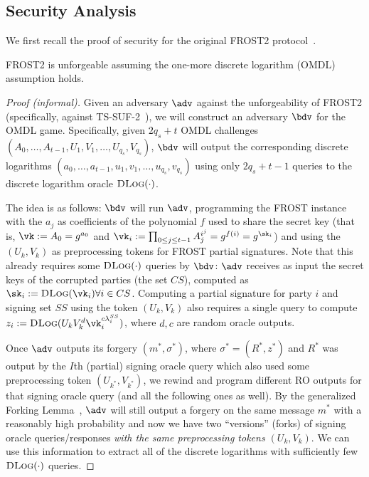 \subsection{Security Analysis}

We first recall the proof of security for the original FROST2 protocol~\cite{C:BCKMTZ22}.

\begin{theorem}[informal]
    FROST2 is unforgeable assuming the one-more discrete logarithm (OMDL) assumption holds.
\end{theorem}

\begin{proof}[Proof (informal)]
Given an adversary $\adv$ against the unforgeability of FROST2 (specifically, against TS-SUF-2~\cite{C:BCKMTZ22}), we will construct an adversary $\bdv$ for the OMDL game. Specifically, given $2q_s + t$ OMDL challenges $(A_0, \dots, A_{t-1}, U_1, V_1, \dots, U_{q_s}, V_{q_s})$, $\bdv$ will output the corresponding discrete logarithms $(a_0, \dots, a_{t-1}, u_1, v_1,\allowbreak \dots, u_{q_s}, v_{q_s})$ using only $2q_s + t - 1$ queries to the discrete logarithm oracle $\textsc{DLog}(\cdot)$.

The idea is as follows: $\bdv$ will run $\adv$, programming the FROST instance with the $a_j$ as coefficients of the polynomial $f$ used to share the secret key (that is, $\vk := A_0 = g^{a_0}$ and $\vk_i := \prod_{0 \leq j \leq t-1} A_j^{i^j} = g^{f(i)} = g^{\sk_i}$) and using the $(U_k, V_k)$ as preprocessing tokens for FROST partial signatures. Note that this already requires some $\textsc{DLog}(\cdot)$ queries by $\bdv$: $\adv$ receives as input the secret keys of the corrupted parties (the set $CS$), computed as $\sk_i := \textsc{DLog}(\vk_i) \forall i \in CS$. Computing a partial signature for party $i$ and signing set $SS$ using the token $(U_k, V_k)$ also requires a single query to compute $z_i := \textsc{DLog}(U_k V_k^d \vk_i^{c \lambda_i^{SS}})$, where $d, c$ are random oracle outputs.

Once $\adv$ outputs its forgery $(m^*, \sigma^*)$, where $\sigma^* = (R^*, z^*)$ and $R^*$ was output by the $I$th (partial) signing oracle query which also used some preprocessing token $(U_{k^*}, V_{k^*})$, we rewind and program different RO outputs for that signing oracle query (and all the following ones as well). By the generalized Forking Lemma~\cite{CCS:BelNev06}, $\adv$ will still output a forgery on the same message $m^*$ with a reasonably high probability and now we have two ``versions'' (forks) of signing oracle queries/responses \emph{with the same preprocessing tokens $(U_k, V_k)$}. We can use this information to extract all of the discrete logarithms with sufficiently few ${\textsc{DLog}}(\cdot)$ queries.


\end{proof}
